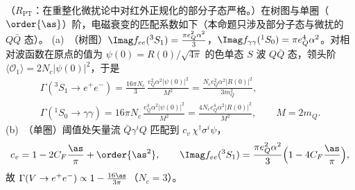 \begin{proposition}\label{prop:heavy-nrqcd-matching}
（$R_{\mathrm{PT}}$：在重整化微扰论中对红外正规化的部分子态严格。）在树图与单圈（$\order{\as}$）阶，电磁衰变的匹配系数如下（本命题只涉及部分子态与微扰的 $Q\bar Q$ 态）。
(a)~（树图）$\Imag f_{ee}({}^3S_1)=\frac{\pi e_Q^2\alpha^2}{3}$，$\Imag f_{\gamma\gamma}({}^1S_0)=\pi e_Q^4\alpha^2$。对相对波函数在原点的值为 $\psi(0)=R(0)/\sqrt{4\pi}$ 的色单态 $S$ 波 $Q\bar Q$ 态，领头阶 $\langle\mathcal O_1\rangle=2N_c|\psi(0)|^2$，于是
\begin{equation}\label{eq:heavy-EMwidths}
\begin{gathered}
\Gamma({}^3S_1\to e^+e^-)=\frac{16\pi N_c}{3}\,\frac{e_Q^2\alpha^2|\psi(0)|^2}{M^2}=\frac{N_ce_Q^2\alpha^2|R(0)|^2}{3m_Q^2},\\
\Gamma({}^1S_0\to\gamma\gamma)=16\pi N_c\,\frac{e_Q^4\alpha^2|\psi(0)|^2}{M^2}=\frac{4N_ce_Q^4\alpha^2|R(0)|^2}{M^2},\qquad M=2m_Q .
\end{gathered}
\end{equation}
(b)~（单圈）阈值处矢量流 $\bar Q\gamma^iQ$ 匹配到 $c_v\,\chi^\dagger\sigma^i\psi$，
\begin{equation}\label{eq:heavy-cv}
c_v=1-2C_F\frac{\as}{\pi}+\order{\as^2},\qquad
\Imag f_{ee}({}^3S_1)=\frac{\pi e_Q^2\alpha^2}{3}\Big(1-4C_F\frac{\as}{\pi}\Big),
\end{equation}
故 $\Gamma(V\to e^+e^-)\propto1-\frac{16\as}{3\pi}$（$N_c=3$）。
\end{proposition}

